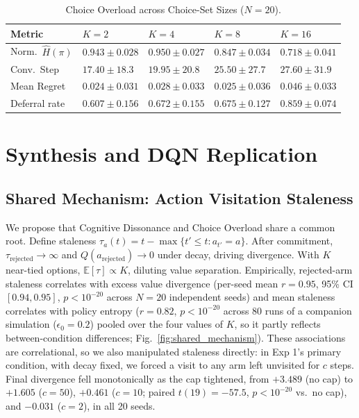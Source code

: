 \documentclass[conference]{IEEEtran}
\begin{document}
\begin{table}[htbp]
\raggedright
\footnotesize
\setlength{\tabcolsep}{4pt}
\caption{Choice Overload across Choice-Set Sizes ($N=20$).}
\label{tab:exp44}
\begin{tabularx}{\linewidth}{@{}LLLLL@{}}
\toprule
\textbf{Metric} & \textbf{$K=2$} & \textbf{$K=4$} & \textbf{$K=8$} & \textbf{$K=16$} \\
\midrule
Norm.\ $\hat{H}(\pi)$ & $0.943\pm0.028$ & $0.950\pm0.027$ & $0.847\pm0.034$ & $0.718\pm0.041$ \\
Conv.\ Step           & $17.40\pm18.3$  & $19.95\pm20.8$  & $25.50\pm27.7$  & $27.60\pm31.9$ \\
Mean Regret           & $0.024\pm0.031$ & $0.028\pm0.033$ & $0.025\pm0.036$ & $0.046\pm0.033$ \\
Deferral rate         & $0.607\pm0.156$ & $0.672\pm0.155$ & $0.675\pm0.127$ & $0.859\pm0.074$ \\
\bottomrule
\end{tabularx}
\end{table}

\section{Synthesis and DQN Replication}

\subsection{Shared Mechanism: Action Visitation Staleness}

We propose that Cognitive Dissonance and Choice Overload share a common root. Define staleness $\tau_a(t)=t-\max\{t'\leq t: a_{t'}=a\}$. After commitment, $\tau_{\text{rejected}}\to\infty$ and $Q(a_{\text{rejected}})\to0$ under decay, driving divergence. With $K$ near-tied options, $\mathbb{E}[\tau]\propto K$, diluting value separation. Empirically, rejected-arm staleness correlates with excess value divergence (per-seed mean $r=0.95$, 95\% CI $[0.94,0.95]$, $p<10^{-20}$ across $N=20$ independent seeds) and mean staleness correlates with policy entropy ($r=0.82$, $p<10^{-20}$ across 80 runs of a companion simulation ($\epsilon_0=0.2$) pooled over the four values of $K$, so it partly reflects between-condition differences; Fig.~\ref{fig:shared_mechanism}). These associations are correlational, so we also manipulated staleness directly: in Exp 1's primary condition, with decay fixed, we forced a visit to any arm left unvisited for $c$ steps. Final divergence fell monotonically as the cap tightened, from $+3.489$ (no cap) to $+1.605$ ($c=50$), $+0.461$ ($c=10$; paired $t(19)=-57.5$, $p<10^{-20}$ vs.\ no cap), and $-0.031$ ($c=2$), in all 20 seeds.
\end{document}
